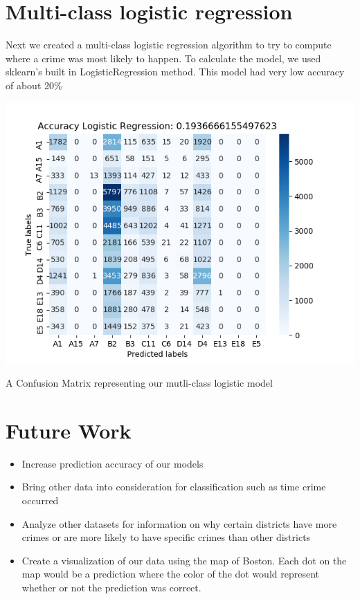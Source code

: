 \documentclass[a0,landscape]{a0poster}
\let\Section=\section
\def\section{\setcounter{equation}{0}\Section}
\newcommand{\1}{\bold{1}}
\begin{document}
\begin{multicols}{3}
\section{Multi-class logistic regression}
Next we created a multi-class logistic regression algorithm to try to compute where a crime was most likely to happen. To calculate the model, we used sklearn's built in LogisticRegression method.  This model had very low accuracy of about 20\% 
 \begin{center}
    \includegraphics[scale = 2]{lr_cm.png}
  
       A Confusion Matrix representing our mutli-class logistic model
   \end{center}


  

\section{Future Work}
\begin{itemize}
    \item Increase prediction accuracy of our models
    \item Bring other data into consideration for classification such as time crime occurred
    \item Analyze other datasets for information on why certain districts have more crimes or are more likely to have specific crimes than other districts 
    \item Create a visualization of our data using the map of Boston. Each dot on the map would be a prediction where the color of the dot would represent whether or not the prediction was correct.
\end{itemize}


\end{multicols}
\end{document}
